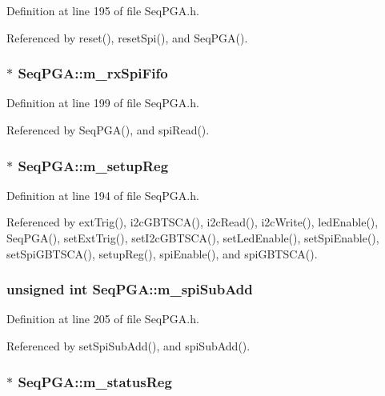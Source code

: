 Definition at line 195 of file SeqPGA.h.

Referenced by reset(), resetSpi(), and SeqPGA().\hypertarget{classSeqPGA_a8ebfe7863e10ab540b5ebecb7655a0d5}{
\subsubsection[{m\_\-rxSpiFifo}]{$\ast$ {\bf SeqPGA::m\_\-rxSpiFifo}}}
\label{classSeqPGA_a8ebfe7863e10ab540b5ebecb7655a0d5}


Definition at line 199 of file SeqPGA.h.

Referenced by SeqPGA(), and spiRead().\hypertarget{classSeqPGA_a03269241e7fc26493cd0595beda334c2}{
\subsubsection[{m\_\-setupReg}]{$\ast$ {\bf SeqPGA::m\_\-setupReg}}}
\label{classSeqPGA_a03269241e7fc26493cd0595beda334c2}


Definition at line 194 of file SeqPGA.h.

Referenced by extTrig(), i2cGBTSCA(), i2cRead(), i2cWrite(), ledEnable(), SeqPGA(), setExtTrig(), setI2cGBTSCA(), setLedEnable(), setSpiEnable(), setSpiGBTSCA(), setupReg(), spiEnable(), and spiGBTSCA().\hypertarget{classSeqPGA_afd5442d9b92f9b59bd553df9bd91dd87}{
\subsubsection[{m\_\-spiSubAdd}]{\setlength{\rightskip}{0pt plus 5cm}unsigned int {\bf SeqPGA::m\_\-spiSubAdd}}}
\label{classSeqPGA_afd5442d9b92f9b59bd553df9bd91dd87}


Definition at line 205 of file SeqPGA.h.

Referenced by setSpiSubAdd(), and spiSubAdd().\hypertarget{classSeqPGA_ae39eb15fbde7a4a48376c8cbdbbceeaa}{
\subsubsection[{m\_\-statusReg}]{$\ast$ {\bf SeqPGA::m\_\-statusReg}}}
\label{classSeqPGA_ae39eb15fbde7a4a48376c8cbdbbceeaa}


